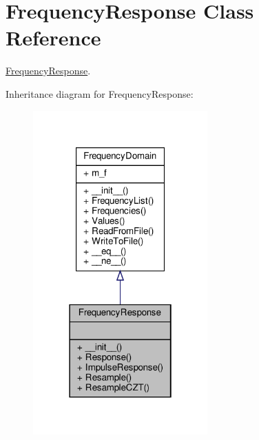 \hypertarget{classSignalIntegrity_1_1FrequencyDomain_1_1FrequencyResponse_1_1FrequencyResponse}{}\section{Frequency\+Response Class Reference}
\label{classSignalIntegrity_1_1FrequencyDomain_1_1FrequencyResponse_1_1FrequencyResponse}


\hyperlink{classSignalIntegrity_1_1FrequencyDomain_1_1FrequencyResponse_1_1FrequencyResponse}{Frequency\+Response}.  




Inheritance diagram for Frequency\+Response\+:
\nopagebreak
\begin{figure}[H]
\begin{center}
\leavevmode
\includegraphics[width=190pt]{classSignalIntegrity_1_1FrequencyDomain_1_1FrequencyResponse_1_1FrequencyResponse__inherit__graph}
\end{center}
\end{figure}


